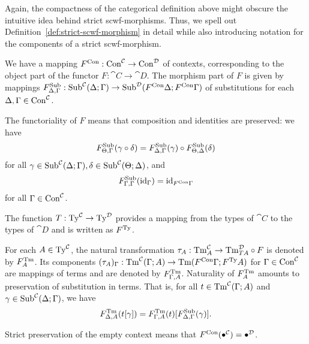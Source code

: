 Again, the compactness of the categorical definition above might obscure the intuitive idea behind strict scwf-morphisms. Thus, we spell out Definition~\ref{def:strict-scwf-morphism} in detail while also introducing notation for the components of a strict scwf-morphism.
\begin{enum}
    \item We have a mapping $\scwfmorcon*{F} : \SCon[\cat{C}] \to \SCon[\cat{D}]$ of contexts, corresponding to the object part of the functor $F : \cat{C} \to \cat{D}$. The morphism part of $F$ is given by mappings $\scwfmorsub*{F}{\Delta}{\Gamma} : \SSub{\Delta}{\Gamma}[\cat{C}] \to \SSub{\scwfmorcon*{F}\Delta}{\scwfmorcon*{F}\Gamma}[\cat{D}]$ of substitutions for each $\Delta, \Gamma \in \SCon[\cat{C}]$.

    The functoriality of $F$ means that composition and identities are preserved: we have
    \[ \scwfmorsub*{F}{\Theta}{\Gamma}(\Scompsub{\gamma}{\delta})
        = \Scompsub{\scwfmorsub*{F}{\Delta}{\Gamma}(\gamma)}{\scwfmorsub*{F}{\Theta}{\Delta}(\delta)} \]
    for all $\gamma \in \SSub{\Delta}{\Gamma}[\cat{C}], \delta \in \SSub{\Theta}{\Delta}[\cat{C}]$, and
    \[ \scwfmorsub*{F}{\Gamma}{\Gamma}(\Sidsub[\Gamma]) = \Sidsub[\scwfmorcon*{F}\Gamma] \]
    for all $\Gamma \in \SCon[\cat{C}]$.

    \item The function $T : \STy[\cat{C}] \to \STy[\cat{D}]$ provides a mapping from the types of $\cat{C}$ to the types of $\cat{D}$ and is written as $\scwfmorty*{F}$.

    \item For each $A \in \STy[\cat{C}]$, the natural transformation $\tau_A : \STm{A}[\cat{C}] \to \STm{TA}[\cat{D}] \circ F$ is denoted by $\scwfmortm*{F}{A}$. Its components $(\tau_A)_\Gamma : \STm[\Gamma]{A}[\cat{C}] \to \STm[\scwfmorcon*{F}\Gamma]{\scwfmorty*{F}A}$ for $\Gamma \in \SCon[\cat{C}]$ are mappings of terms and are denoted by $\scwfmortm*{F}[\Gamma]{A}$. Naturality of $\scwfmortm*{F}{A}$ amounts to preservation of substitution in terms. That is, for all $t \in \STm[\Gamma]{A}[\cat{C}]$ and $\gamma \in \SSub{\Delta}{\Gamma}[\cat{C}]$, we have
    \[ \scwfmortm*{F}[\Delta]{A}(\Ssubst{t}{\gamma}) = \Ssubst{\scwfmortm*{F}[\Gamma]{A}(t)}{\scwfmorsub*{F}{\Delta}{\Gamma}(\gamma)}. \]

    \item Strict preservation of the empty context means that $\scwfmorcon*{F}(\Sempcon[\cat{C}]) = \Sempcon[\cat{D}]$.


\end{enum}
